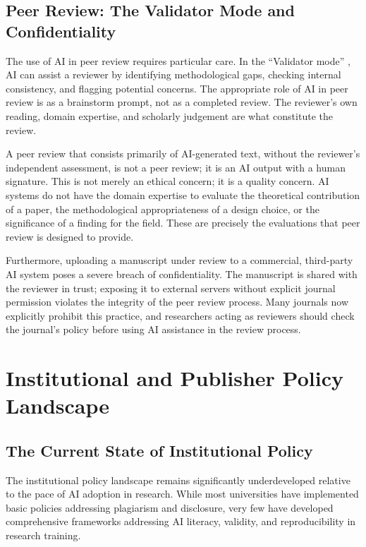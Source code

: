 \documentclass[12pt, a4paper]{article}
\begin{document}
\subsection{Peer Review: The Validator Mode and Confidentiality}

The use of AI in peer review requires particular care. In the ``Validator mode'' \citep{zyphur2026responsible}, AI can assist a reviewer by identifying methodological gaps, checking internal consistency, and flagging potential concerns. The appropriate role of AI in peer review is as a brainstorm prompt, not as a completed review. The reviewer's own reading, domain expertise, and scholarly judgement are what constitute the review.

A peer review that consists primarily of AI-generated text, without the reviewer's independent assessment, is not a peer review; it is an AI output with a human signature. This is not merely an ethical concern; it is a quality concern. AI systems do not have the domain expertise to evaluate the theoretical contribution of a paper, the methodological appropriateness of a design choice, or the significance of a finding for the field. These are precisely the evaluations that peer review is designed to provide.

Furthermore, uploading a manuscript under review to a commercial, third-party AI system poses a severe breach of confidentiality. The manuscript is shared with the reviewer in trust; exposing it to external servers without explicit journal permission violates the integrity of the peer review process. Many journals now explicitly prohibit this practice, and researchers acting as reviewers should check the journal's policy before using AI assistance in the review process.

\section{Institutional and Publisher Policy Landscape}

\subsection{The Current State of Institutional Policy}

The institutional policy landscape remains significantly underdeveloped relative to the pace of AI adoption in research. While most universities have implemented basic policies addressing plagiarism and disclosure, very few have developed comprehensive frameworks addressing AI literacy, validity, and reproducibility in research training.
\end{document}
